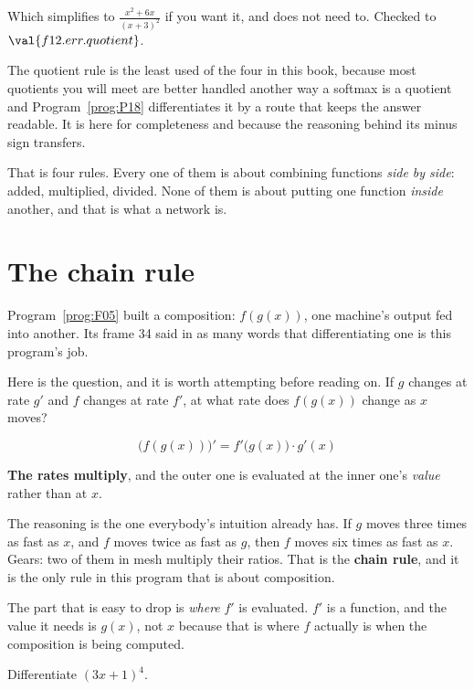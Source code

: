 \begin{fr}
Which simplifies to $\frac{x^{2} + 6x}{(x+3)^{2}}$ if you want it, and does
not need to. Checked to $\val{f12.err.quotient}$.

\begin{note}
The quotient rule is the least used of the four in this book, because most
quotients you will meet are better handled another way \dash{} a softmax is a
quotient and Program~\ref{prog:P18} differentiates it by a route that keeps
the answer readable. It is here for completeness and because the reasoning
behind its minus sign transfers.
\end{note}

That is four rules. Every one of them is about combining functions
\emph{side by side}: added, multiplied, divided. None of them is about putting
one function \emph{inside} another, and that is what a network is.
\end{fr}

\section{The chain rule}
\label{sec:F12-chain}

\begin{fr}
Program~\ref{prog:F05} built a composition: $f(g(x))$, one machine's output
fed into another. Its frame 34 said in as many words that differentiating one
is this program's job.

Here is the question, and it is worth attempting before reading on. If $g$
changes at rate $g'$ and $f$ changes at rate $f'$, at what rate does $f(g(x))$
change as $x$ moves?
\dotline
\nextframe
\end{fr}

\begin{fr}
\begin{ansblock}
\[ \bigl(f(g(x))\bigr)' = f'\bigl(g(x)\bigr) \cdot g'(x) \]
\end{ansblock}

\textbf{The rates multiply}, and the outer one is evaluated at the inner one's
\emph{value} rather than at $x$.

The reasoning is the one everybody's intuition already has. If $g$ moves three
times as fast as $x$, and $f$ moves twice as fast as $g$, then $f$ moves six
times as fast as $x$. Gears: two of them in mesh multiply their ratios. That
is the \textbf{chain rule}, and it is the only rule in this program that is
about composition.

The part that is easy to drop is \emph{where} $f'$ is evaluated. $f'$ is a
function, and the value it needs is $g(x)$, not $x$ \dash{} because that is
where $f$ actually is when the composition is being computed.

Differentiate $(3x + 1)^{4}$.
\nextframe
\end{fr}

